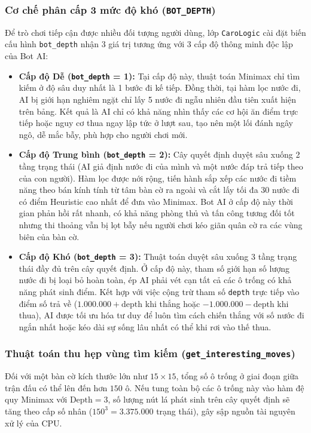 \subsubsection{Cơ chế phân cấp 3 mức độ khó (\texttt{BOT\_DEPTH})}
Để trò chơi tiếp cận được nhiều đối tượng người dùng, lớp \texttt{CaroLogic} cài đặt biến cấu hình \texttt{bot\_depth} nhận 3 giá trị tương ứng với 3 cấp độ thông minh độc lập của Bot AI:
\begin{itemize}
	\item \textbf{Cấp độ Dễ (\texttt{bot\_depth} = 1):} Tại cấp độ này, thuật toán Minimax chỉ tìm kiếm ở độ sâu duy nhất là 1 bước đi kế tiếp. Đồng thời, tại hàm lọc nước đi, AI bị giới hạn nghiêm ngặt chỉ lấy 5 nước đi ngẫu nhiên đầu tiên xuất hiện trên bảng. Kết quả là AI chỉ có khả năng nhìn thấy các cơ hội ăn điểm trực tiếp hoặc nguy cơ thua ngay lập tức ở lượt sau, tạo nên một lối đánh ngây ngô, dễ mắc bẫy, phù hợp cho người chơi mới.
	\item \textbf{Cấp độ Trung bình (\texttt{bot\_depth} = 2):} Cây quyết định duyệt sâu xuống 2 tầng trạng thái (AI giả định nước đi của mình và một nước đáp trả tiếp theo của con người). Hàm lọc được nới rộng, tiến hành sắp xếp các nước đi tiềm năng theo bán kính tính từ tâm bàn cờ ra ngoài và cắt lấy tối đa 30 nước đi có điểm Heuristic cao nhất để đưa vào Minimax. Bot AI ở cấp độ này thời gian phản hồi rất nhanh, có khả năng phòng thủ và tấn công tương đối tốt nhưng thi thoảng vẫn bị lọt bẫy nếu người chơi kéo giãn quân cờ ra các vùng biên của bàn cờ.
	\item \textbf{Cấp độ Khó (\texttt{bot\_depth} = 3):} Thuật toán duyệt sâu xuống 3 tầng trạng thái đầy đủ trên cây quyết định. Ở cấp độ này, tham số giới hạn số lượng nước đi bị loại bỏ hoàn toàn, ép AI phải vét cạn tất cả các ô trống có khả năng phát sinh điểm. Kết hợp với việc cộng trừ tham số \texttt{depth} trực tiếp vào điểm số trả về ($1.000.000 + \text{depth}$ khi thắng hoặc $-1.000.000 - \text{depth}$ khi thua), AI được tối ưu hóa tư duy để luôn tìm cách chiến thắng với số nước đi ngắn nhất hoặc kéo dài sự sống lâu nhất có thể khi rơi vào thế thua.
\end{itemize}

\subsubsection{Thuật toán thu hẹp vùng tìm kiếm (\texttt{get\_interesting\_moves})}
Đối với một bàn cờ kích thước lớn như $15 \times 15$, tổng số ô trống ở giai đoạn giữa trận đấu có thể lên đến hơn $150$ ô. Nếu tung toàn bộ các ô trống này vào hàm đệ quy Minimax với $\text{Depth} = 3$, số lượng nút lá phát sinh trên cây quyết định sẽ tăng theo cấp số nhân ($150^3 = 3.375.000$ trạng thái), gây sập nguồn tài nguyên xử lý của CPU.

